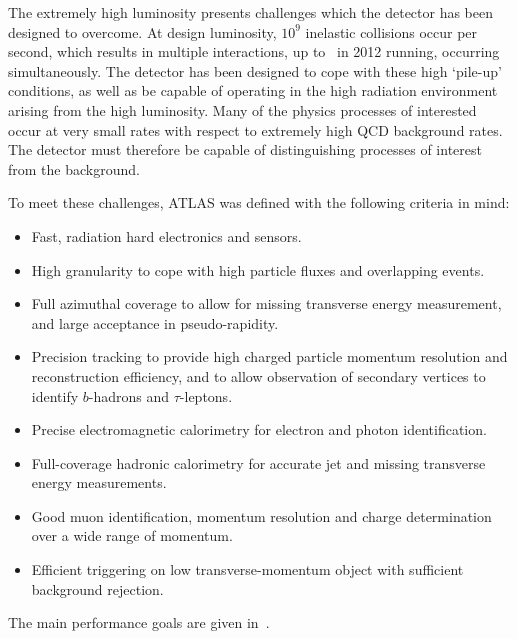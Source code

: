 The extremely high luminosity presents challenges which
the detector has been designed to overcome. At design luminosity, $10^9$
inelastic collisions occur per second, which results in multiple interactions, up to
\PeakIntPerBunchCrossing\ in 2012 running, occurring
simultaneously. The detector has been designed to cope with these high
`pile-up' conditions, as well as be capable of operating in the high radiation
environment arising from the high luminosity. Many of the physics processes of interested occur at very
small rates with respect to extremely high QCD background rates. The detector
must therefore be capable of distinguishing processes of interest from the
background. 

To meet these challenges, ATLAS was defined with the following
criteria in mind:

\begin{itemize}
\item Fast, radiation hard electronics and sensors.
\item High granularity to  cope with high particle fluxes and overlapping events.
\item Full azimuthal coverage to allow for missing transverse energy
measurement, and large acceptance in pseudo-rapidity.
\item Precision tracking to provide high charged particle momentum resolution
and reconstruction efficiency, and to allow observation of secondary vertices to
identify $b$-hadrons and $\tau$-leptons.
\item Precise electromagnetic calorimetry for electron and photon
identification.
\item Full-coverage hadronic calorimetry for accurate jet and missing transverse
energy measurements.
\item Good muon identification, momentum resolution and charge determination over a wide range of
momentum.
\item Efficient triggering on low transverse-momentum object with sufficient
background rejection.
\end{itemize}

The main performance goals are given in~.

